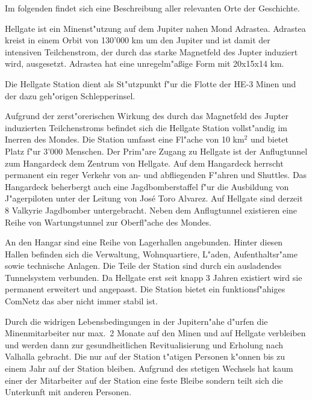 
Im folgenden findet sich eine Beschreibung aller relevanten Orte der Geschichte.


Hellgate ist ein Minenst"utzung auf dem Jupiter nahen Mond Adrastea. Adrastea kreist in einem Orbit von 130'000 km um den Jupiter und
ist damit der intensiven Teilchenstrom, der durch das starke Magnetfeld des Jupter induziert wird, ausgesetzt. Adrastea hat eine unregelm"aßige Form mit 20x15x14 km.

Die Hellgate Station dient als St"utzpunkt f"ur die Flotte der HE-3 Minen und der dazu geh"origen Schlepperinsel. 

Aufgrund der zerst"orerischen Wirkung des durch das Magnetfeld des Jupter induzierten Teilchenstroms befindet sich die Hellgate Station vollst"andig im Inerren des Mondes. Die Station umfasst eine Fl"ache von 10 km$^{2}$ und bietet Platz f"ur 3'000 Menschen. Der Prim"are Zugang zu Hellgate ist der Anflugtunnel zum Hangardeck dem Zentrum von Hellgate. Auf dem Hangardeck herrscht permanent ein reger Verkehr von an- und abfliegenden F"ahren und Shuttles. Das Hangardeck beherbergt auch eine Jagdbomberstaffel f"ur die Ausbildung von J"agerpiloten unter der Leitung von Jos\'{e} \frqq{}Toro\flqq{} Alvarez. Auf Hellgate sind derzeit 8 Valkyrie Jagdbomber untergebracht. Neben dem Anflugtunnel existieren eine Reihe von Wartungstunnel zur Oberfl"ache des Mondes.

An den Hangar sind eine Reihe von Lagerhallen angebunden. Hinter diesen Hallen befinden sich die Verwaltung, Wohnquartiere, L"aden, Aufenthaltsr"ame sowie technische Anlagen. Die Teile der Station sind durch ein ausladendes Tunnelsystem verbunden. Da Hellgate erst seit knapp 3 Jahren existiert wird sie permanent erweitert und angepasst. Die Station bietet ein funktionsf"ahiges ComNetz das aber nicht immer stabil ist.

Durch die widrigen Lebensbedingungen in der Jupitern"ahe d"urfen die Minenmitarbeiter nur max.~2 Monate auf den Minen und auf Hellgate verbleiben und werden dann zur gesundheitlichen Revitualisierung und Erholung nach Valhalla gebracht. Die nur auf der Station t"atigen Personen k"onnen bis zu einem Jahr auf der Station bleiben. Aufgrund des stetigen Wechsels hat kaum einer der Mitarbeiter auf der Station eine feste Bleibe sondern teilt sich die Unterkunft mit anderen Personen.

